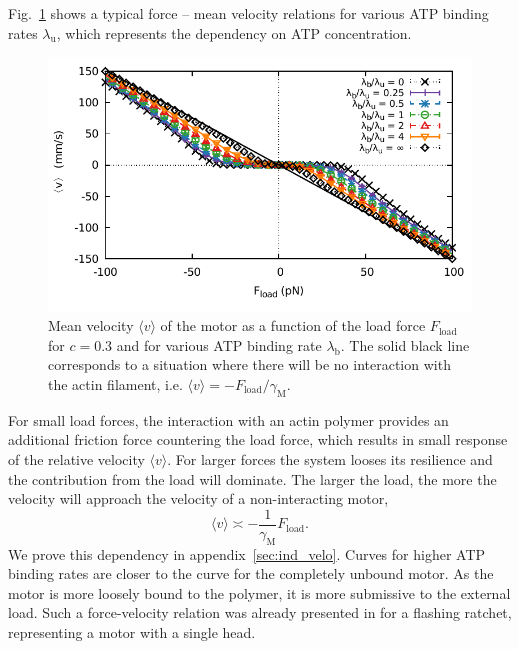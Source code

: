 \documentclass[aps,pre,twocolumn,showpacs,showkeys,superscriptaddress,floatfix]{revtex4-1}
\begin{document}
Fig.~\ref{fig:F_v} shows a typical force -- mean velocity relations for various ATP binding rates $\lambda_\text{u}$, which represents the dependency on ATP concentration.
\begin{figure}[t]
\centering
\includegraphics[width=0.9\linewidth,height=!]{F_v}
\caption{
\label{fig:F_v} 
Mean velocity $\langle v \rangle$ of the motor as a function of the load force $F_\text{load}$ for $c=0.3$ and for various ATP binding rate $\lambda_\text{b}$.
The solid black line corresponds to a situation where there will be no interaction with the actin filament, i.e. $\langle v \rangle = - F_\text{load} / \gamma_\text{M}$. 
}
\end{figure}
For small load forces, the interaction with an actin polymer provides an additional friction force countering the load force, 
which results in small response of the relative velocity $\langle v \rangle$.
For larger forces the system looses its resilience and the contribution from the load will dominate. 
The larger the load, the more the velocity will approach the velocity of a non-interacting motor, 
\[
\langle v \rangle \asymp - \frac{1}{\gamma_\text{M}} F_\text{load}.
\]
We prove this dependency in appendix~\ref{sec:ind_velo}. 
Curves for higher ATP binding rates are closer to the curve for the completely unbound motor.
As the motor is more loosely bound to the polymer, it is more submissive to the external load.
Such a force-velocity relation was already presented in %
 \cite{reimann2002brownian} for a flashing ratchet, representing a motor with a single head.
\end{document}
